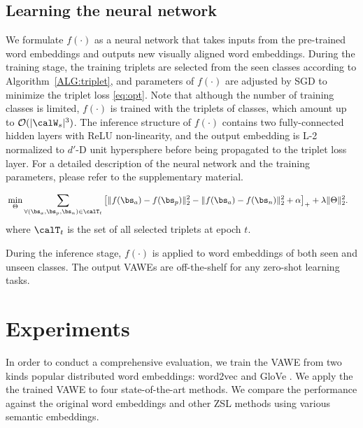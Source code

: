\documentclass{bmvc2k}
\begin{document}
\subsection{Learning the neural network}
We formulate $f(\cdot)$ as a neural network that takes inputs from the pre-trained word embeddings and outputs new visually aligned word embeddings. During the training stage, the training triplets are selected from the seen classes according to Algorithm~\ref{ALG:triplet}, and parameters of $f(\cdot)$ are adjusted by SGD to minimize the triplet loss \eqref{eq:opt}. Note that although the number of training classes is limited, $f(\cdot)$ is trained with the triplets of classes, which amount up to $\mathcal{O} (| \calW_s |^3)$. The inference structure of $f(\cdot)$ contains two fully-connected hidden layers with ReLU non-linearity, and the output embedding is L-2 normalized to $d'$-D unit hypersphere before being propagated to the triplet loss layer. For a detailed description of the neural network and the training parameters, please refer to the supplementary material.

\begin{align}\label{eq:opt}
& \min_{\Theta} \sum_{\forall (\bs_a, \bs_p, \bs_n) \in \calT_t} \left[  \|f(\bs_a) - f(\bs_p) \|_2^2 - \|f(\bs_a) - f(\bs_n) \|_2^2 + \alpha \right]_+  +  \lambda \| \Theta \|_2^2.
\end{align}
where $\calT_t$ is the set of all selected triplets at epoch $t$.


During the inference stage, $f(\cdot)$ is applied to word embeddings of both seen and unseen classes. The output VAWEs are off-the-shelf for any zero-shot learning tasks.










\section{Experiments}
\label{sec: exp}
In order to conduct a comprehensive evaluation, we train the VAWE from two kinds popular distributed word embeddings: word2vec \cite{word2vec} and GloVe \cite{glove}. We apply the the trained VAWE to four state-of-the-art methods. We compare the performance against the original word embeddings and other ZSL methods using various semantic embeddings. %
\end{document}
